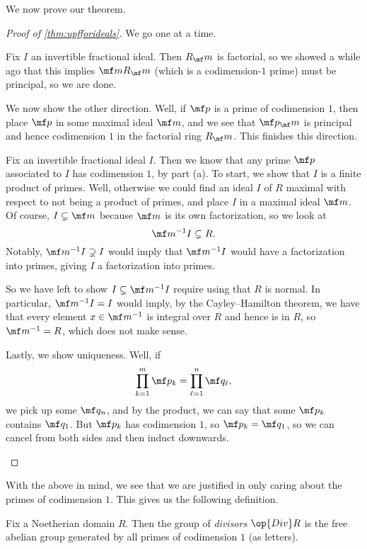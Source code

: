 \documentclass[../notes.tex]{subfiles}
\begin{document}
We now prove our theorem.
\begin{proof}[Proof of \autoref{thm:upfforideals}]
	We go one at a time.
	\begin{listalph}
		\item Fix $I$ an invertible fractional ideal. Then $R_\mf m$ is factorial, so we showed a while ago that this implies $\mf mR_\mf m$ (which is a codimension-$1$ prime) must be principal, so we are done.

		We  now show the other direction. Well, if $\mf p$ is a prime of codimension $1$, then place $\mf p$ in some maximal ideal $\mf m$, and we see that $\mf p_\mf m$ is principal and hence codimension $1$ in the factorial ring $R_\mf m$. This finishes this direction.

		\item Fix an invertible fractional ideal $I$. Then we know that any prime $\mf p$ associated to $I$ has codimension $1$, by part (a). To start, we show that $I$ is a finite product of primes. Well, otherwise we could find an ideal $I$ of $R$ maximal with respect to not being a product of primes, and place $I$ in a maximal ideal $\mf m$. Of course, $I\subsetneq\mf m$ because $\mf m$ is its own factorization, so we look at
		\[\mf m^{-1}I\subsetneq R.\]
		Notably, $\mf m^{-1}I\supsetneq I$ would imply that $\mf m^{-1}I$ would have a factorization into primes, giving $I$ a factorization into primes.

		So we have left to show $I\subsetneq\mf m^{-1}I$ require using that $R$ is normal. In particular, $\mf m^{-1}I=I$ would imply, by the Cayley--Hamilton theorem, we have that every element $x\in\mf m^{-1}$ is integral over $R$ and hence is in $R$, so $\mf m^{-1}=R$, which does not make sense.

		Lastly, we show uniqueness. Well, if
		\[\prod_{k=1}^m\mf p_k=\prod_{\ell=1}^n\mf q_\ell,\]
		we pick up some $\mf q_n$, and by the product, we can say that some $\mf p_k$ contains $\mf q_1$. But $\mf p_k$ has codimension $1$, so $\mf p_k=\mf q_1$, so we can cancel from both sides and then induct downwards.
		\qedhere
	\end{listalph}
\end{proof}
With the above in mind, we see that we are justified in only caring about the primes of codimension $1$. This gives us the following definition.
\begin{definition}[Divisor]
	Fix a Noetherian domain $R$. Then the group of \textit{divisors} $\op{Div}R$ is the free abelian group generated by all primes of codimension $1$ (as letters).
\end{definition}
\end{document}
